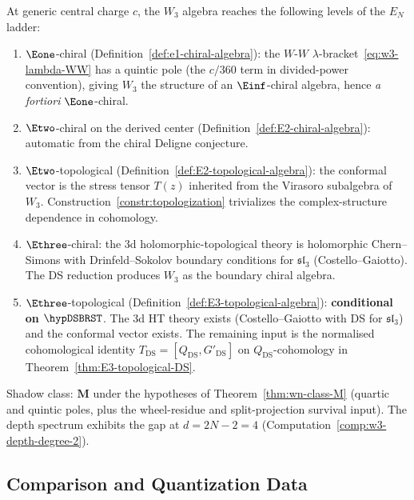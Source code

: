 \begin{remark}
\label{rem:w3-EN-level}
At generic central charge $c$, the $W_3$ algebra reaches the
following levels of the $E_N$ ladder:
\begin{enumerate}[label=\textup{(\roman*)}]
\item $\Eone$-chiral
 (Definition~\ref{def:e1-chiral-algebra}): the $W$-$W$
 $\lambda$-bracket~\eqref{eq:w3-lambda-WW} has a quintic
 pole (the $c/360$ term in divided-power convention),
 giving $W_3$ the structure of an $\Einf$-chiral algebra,
 hence \emph{a fortiori} $\Eone$-chiral.

\item $\Etwo$-chiral on the derived center
 (Definition~\ref{def:E2-chiral-algebra}): automatic from
 the chiral Deligne conjecture.

\item $\Etwo$-topological
 (Definition~\ref{def:E2-topological-algebra}): the
 conformal vector is the stress tensor $T(z)$ inherited
 from the Virasoro subalgebra of $W_3$.
 Construction~\ref{constr:topologization} trivializes the
 complex-structure dependence in cohomology.

\item $\Ethree$-chiral: the 3d holomorphic-topological
 theory is holomorphic Chern--Simons with
 Drinfeld--Sokolov boundary conditions for
 $\mathfrak{sl}_3$ (Costello--Gaiotto). The DS reduction
 produces $W_3$ as the boundary chiral algebra.

\item $\Ethree$-topological
 (Definition~\ref{def:E3-topological-algebra}):
 \textbf{conditional on \(\hypDSBRST\)}. The 3d
 HT theory exists (Costello--Gaiotto with DS for
 $\mathfrak{sl}_3$) and the conformal vector exists. The remaining
 input is the normalised cohomological identity
 $T_{\mathrm{DS}} = [Q_{\mathrm{DS}}, G'_{\mathrm{DS}}]$ on
 $Q_{\mathrm{DS}}$-cohomology in
 Theorem~\ref{thm:E3-topological-DS}.
\end{enumerate}
Shadow class: $\mathbf{M}$ under the hypotheses of
Theorem~\ref{thm:wn-class-M} (quartic and quintic poles, plus the
wheel-residue and split-projection survival input). The
depth spectrum exhibits the gap at $d = 2N - 2 = 4$
(Computation~\ref{comp:w3-depth-degree-2}).
\end{remark}

\subsection{Comparison and Quantization Data}
\label{subsec:quantization}

